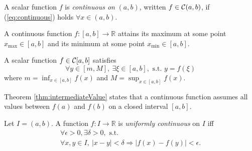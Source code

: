 \begin{defn}
  \label{def:continuousFuncOnR}
  A scalar function $f$ is \emph{continuous on} $(a,b)$,
     written \mbox{$f\in{\cal C}(a,b)$}, 
     if (\ref{eq:continuous}) holds  $\forall x\in (a,b)$.
\end{defn}


\begin{thm}
  \label{thm:extremeValues}
  A continuous function $f:[a,b]\rightarrow\mathbb{R}$
  attains its maximum at some point \mbox{$x_{\max}\in [a,b]$}
  and its minimum at some point $x_{\min}\in [a,b]$.
\end{thm}

\begin{thm}
  \label{thm:intermediateValue}
  A scalar function $f\in {\cal C}[a,b]$ satisfies
  \begin{equation}
    \label{eq:intermediateValue}
    \forall y\in \left[m, M \right],\ 
    \exists \xi\in[a,b], \text{ s.t. }
    y=f(\xi)
  \end{equation}
  where  $m=\inf_{x\in[a,b]} f(x)$ and
   $M=\sup_{x\in[a,b]} f(x)$.
\end{thm}

\begin{rem}
Theorem \ref{thm:intermediateValue}
 states that a continuous function assumes
 all values between $f(a)$ and $f(b)$
 on a closed interval $[a,b]$.
\end{rem}

\begin{defn}
  \label{def:uniformlyContinuousScalar}
  Let $I=(a,b)$. A function $f: I\rightarrow \mathbb{R}$
  is \emph{uniformly continuous} on $I$
  iff
   \begin{equation}
     \label{eq:uniformlyContinuous}
     \begin{array}{l}
     \forall \epsilon>0, \exists \delta>0,\text{ s.t. }
     \\
     \forall x,y\in I,\ 
     |x-y|<\delta \Rightarrow |f(x)-f(y)|<\epsilon.
     \end{array}
   \end{equation}
\end{defn}

